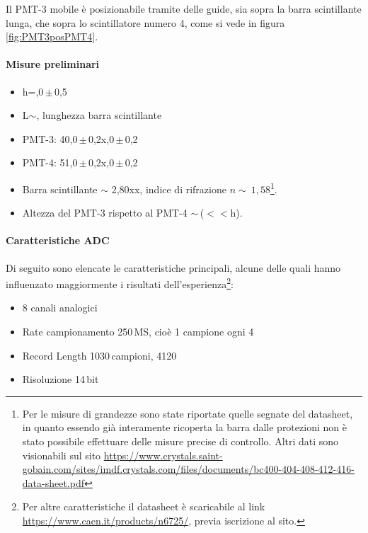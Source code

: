 \documentclass[a4paper,twocolumn]{article}
\begin{document}
Il PMT-3 mobile è posizionabile tramite delle guide, sia sopra la barra scintillante lunga, che sopra lo scintillatore numero 4, come si vede in figura \ref{fig:PMT3posPMT4}.

\paragraph{Misure preliminari}
\begin{itemize}
\item h\;=,0\,$\pm$\,0,5\:\centi\metre
\item L\;$\sim$\:\centi\metre, lunghezza barra scintillante
\item PMT-3: 40,0\,$\pm$\,0,2\:\centi\metre\;x,0\,$\pm$\,0,2\:\centi\metre 
\item PMT-4: 51,0\,$\pm$\,0,2\:\centi\metre\;x,0\,$\pm$\,0,2\:\centi\metre 
\item Barra scintillante $\sim$ 2,80\:\metre\;x\:\centi\metre\;x\:\centi\metre, indice di rifrazione $n\sim\:1,58$\footnote{Per le misure di grandezze sono state riportate quelle segnate del datasheet, in quanto essendo già interamente ricoperta la barra dalle protezioni non è stato possibile effettuare delle misure precise di controllo. Altri dati sono visionabili sul sito \url{https://www.crystals.saint-gobain.com/sites/imdf.crystals.com/files/documents/bc400-404-408-412-416-data-sheet.pdf}}.
\item Altezza del PMT-3 rispetto al PMT-4 $\sim$\,\centi\metre\;($<<$h).
\end{itemize}

\paragraph{Caratteristiche ADC}
Di seguito sono elencate le caratteristiche principali, alcune delle quali hanno influenzato maggiormente i risultati dell'esperienza\footnote{Per altre caratteristiche il datasheet è scaricabile al link \url{https://www.caen.it/products/n6725/}, previa iscrizione al sito.}:
\begin{itemize}
\item 8 canali analogici
\item Rate campionamento 250\,MS\per\second, cioè 1 campione ogni 4\,\nano\second
\item Record Length 1030\,campioni, 4120\,\nano\second
\item Risoluzione 14\,bit
\end{itemize}
\end{document}

